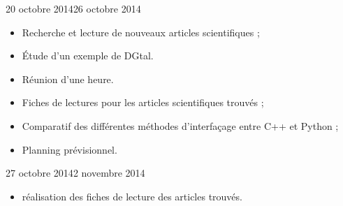\documentclass[11pt, french, screen]{report-rd-info}
\begin{document}
\begin{fichesuivi}{20 octobre 2014}{26 octobre 2014}

	\begin{travaileffectue}
	    \begin{itemize}
	        \item Recherche et lecture de nouveaux articles scientifiques ;
            \item Étude d'un exemple de DGtal.
        \end{itemize}
	\end{travaileffectue}

	\begin{travailnoneffectue}
	\end{travailnoneffectue}

	\begin{echange}
	    \begin{itemize}
	        \item Réunion d'une heure.
	    \end{itemize}
	\end{echange}

	\begin{planification}
    	\begin{itemize}
    	    \item Fiches de lectures pour les articles scientifiques trouvés ;
            \item Comparatif des différentes méthodes d'interfaçage entre C++ et Python ;
            \item Planning prévisionnel.
        \end{itemize}
	\end{planification}
\end{fichesuivi}

\begin{fichesuivi}{27 octobre 2014}{2 novembre 2014}

	\begin{travaileffectue}
	    \begin{itemize}
	        \item réalisation des fiches de lecture des articles trouvés.
	    \end{itemize}
	\end{travaileffectue}

	\begin{travailnoneffectue}
	\end{travailnoneffectue}

	\begin{echange}
	\end{echange}

	\begin{planification}
	\end{planification}
\end{fichesuivi}
\end{document}
